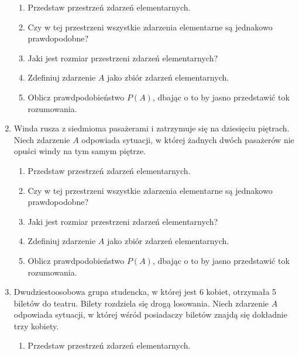 \documentclass[twoside]{mwart}
\newcommand{\ans}[1]{}
\newcommand{\ans}[1]{\par\emph{Odpowiedź:} #1}
\begin{document}
\begin{enumerate}
\begin{enumerate}%
\item Przedstaw przestrzeń zdarzeń elementarnych. \ans{$\Omega=\{\omega_J|\left|J\right|=50 \land J\subset\{1,2,\ldots,100\}\}$}%
\item Czy w tej przestrzeni wszystkie zdarzenia elementarne są jednakowo prawdopodobne? \ans{Tak}%
\item Jaki jest rozmiar przestrzeni zdarzeń elementarnych? \ans{$\left|\Omega\right|={100\choose 50}$}%
\item Zdefiniuj zdarzenie $A$ jako zbiór zdarzeń elementarnych. \ans{$A=\{\omega_J|\left|J\cap \{1,2,\ldots,5\}\right|\leq 1\}$}%
\item Oblicz prawdpodobieństwo $P(A)$, dbając o to by jasno przedstawić tok rozumowania. \ans{$\left|A\right|={5\choose 1}{95\choose 49}+{95\choose 50}, P(A)\approx0{,}181$}%
\end{enumerate}%
\item Winda rusza z siedmioma pasażerami i zatrzymuje się na dziesięciu piętrach. Niech zdarzenie $A$ odpowiada sytuacji, w której żadnych dwóch pasażerów nie opuści windy na tym samym piętrze.
\begin{enumerate}%
\item Przedstaw przestrzeń zdarzeń elementarnych. \ans{$\Omega=\{\omega_{i_1,\ldots,i_7}|i_j=1,2,\ldots,10\}$}%
\item Czy w tej przestrzeni wszystkie zdarzenia elementarne są jednakowo prawdopodobne? \ans{Tak}%
\item Jaki jest rozmiar przestrzeni zdarzeń elementarnych? \ans{$\left|\Omega\right|=10^7$}%
\item Zdefiniuj zdarzenie $A$ jako zbiór zdarzeń elementarnych. \ans{$A=\{\omega_{i_1,\ldots,i_7}|\forall j,k\colon j\neq k\to i_j\neq i_k\}, \left|A\right|=\frac{10!}{3!}=604800$}%
\item Oblicz prawdpodobieństwo $P(A)$, dbając o to by jasno przedstawić tok rozumowania. \ans{$P(A)=\frac{604800}{10^7}=0{,}06$}%
\end{enumerate}%
\item Dwudziestoosobowa grupa studencka, w której jest 6 kobiet, otrzymała 5 biletów do teatru. Bilety rozdziela się drogą losowania. Niech zdarzenie $A$ odpowiada sytuacji, w której wśród posiadaczy biletów znajdą się dokładnie trzy kobiety.
\begin{enumerate}%
\item Przedstaw przestrzeń zdarzeń elementarnych. \ans{$\Omega=\{\omega_J|\left|J\right|=5 \land J\subset\{1,2,\ldots,20\}\}$}%

\end{enumerate}
\end{enumerate}
\end{document}
